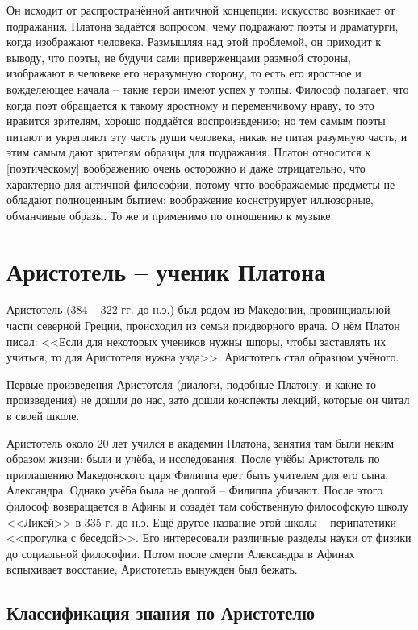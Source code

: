 \documentclass[a4paper, 12pt]{book} %
\begin{document}
Он исходит от распространённой античной концепции: искусство возникает от подражания. Платона задаётся вопросом, чему подражают поэты и драматурги, когда изображают человека. Размышляя над этой проблемой, он приходит к выводу, что поэты, не будучи сами приверженцами размной стороны, изображают в человеке его неразумную сторону, то есть его яростное и вожделеющее начала -- такие герои имеют успех у толпы. Философ полагает, что когда поэт обращается к такому яростному и переменчивому нраву, то это нравится зрителям, хорошо поддаётся воспроизвдению; но тем самым поэты питают и укрепляют эту часть души человека, никак не питая разумную часть, и этим самым дают зрителям образцы для подражания. Платон относится к [поэтическому] воображению очень осторожно и даже отрицательно, что характерно для античной философии, потому чтто воображаемые предметы не обладают полноценным бытием: воображение коснструирует иллюзорные, обманчивые образы.  То же и применимо по отношению к музыке.

\section{Аристотель -- ученик Платона}

Аристотель (384 -- 322 гг. до н.э.) был родом из Македонии, провинциальной части северной Греции, происходил из семьи придворного врача.
О нём Платон писал: <<Если для некоторых учеников нужны шпоры, чтобы заставлять их учиться, то для Аристотеля нужна узда>>. Аристотель стал образцом учёного. 

Первые произведения Аристотеля (диалоги, подобные Платону, и какие-то произведения) не дошли до нас, зато дошли конспекты лекций, которые он читал в своей школе. 

Аристотель около 20 лет учился в академии Платона, занятия там были неким образом жизни: были и учёба, и исследования. После учёбы Аристотель по приглашению Македонского царя Филиппа едет быть учителем для его сына, Александра. Однако учёба была не долгой -- Филиппа убивают. После этого философ возвращается в Афины и созадёт там собственную философскую школу <<Ликей>> в 335 г. до н.э. Ещё другое название этой  школы -- перипатетики -- <<прогулка с беседой>>. Его интересовали различные разделы науки от физики до социальной философии. Потом после смерти Александра в Афинах вспыхивает восстание, Аристотетль вынужден был бежать. 

\subsection{Классификация знания по Аристотелю}
\end{document}
